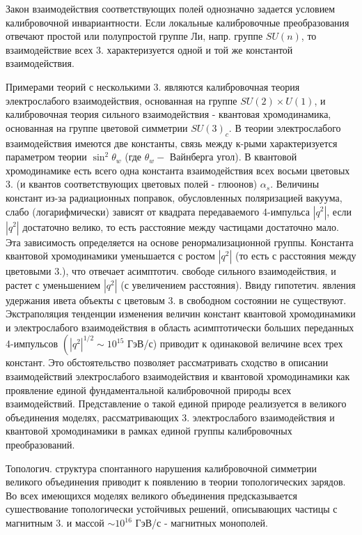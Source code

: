 \documentclass[10pt]{article}
\begin{document}
Закон взаимодействия соответствующих полей однозначно задается условием калибровочной инвариантности. Если локальные калибровочные преобразования отвечают простой или полупростой группе Ли, напр. группе $S U(n)$, то взаимодействие всех 3. характеризуется одной и той же константой взаимодействия.



Примерами теорий с несколькими 3. являются калибровочная теория электрослабого взаимодействия, основанная на группе $S U(2) \times U(1)$, и калибровочная теория сильного взаимодействия - квантовая хромодинамика, основанная на группе цветовой симметрии $S U(3)_{c}$. В теории электрослабого взаимодействия имеются две константы, связь между к-рыми характеризуется параметром теории $\sin ^{2} \theta_{w}$ (где $\theta_{w}-$ Вайнберга угол). В квантовой хромодинамике есть всего одна константа взаимодействия всех восьми цветовых 3. (и квантов соответствующих цветовых полей - глюонов) $\alpha_{s}$. Величины констант из-за радиационных поправок, обусловленных поляризацией вакуума, слабо (логарифмически) зависят от квадрата передаваемого 4-импульса $\left|q^{2}\right|$, если $\left|q^{2}\right|$ достаточно велико, то есть расстояние между частицами достаточно мало. Эта зависимость определяется на основе ренормализационной группы. Константа квантовой хромодинамики уменьшается с ростом $\left|q^{2}\right|$ (то есть с расстояния между цветовыми 3.), что отвечает асимптотич. свободе сильного взаимодействия, и растет с уменьшением $\left|q^{2}\right|$ (с увеличением расстояния). Ввиду гипотетич. явления удержания ивета объекты с цветовым 3. в свободном состоянии не существуют. Экстраполяция тенденции изменения величин констант квантовой хромодинамики и электрослабого взаимодействия в область асимптотически больших переданных 4-импульсов $\left(\left|q^{2}\right|^{1 / 2} \sim 10^{15}\right.$ ГэВ/с) приводит к одинаковой величине всех трех констант. Это обстоятельство позволяет рассматривать сходство в описании взаимодействий электрослабого взаимодействия и квантовой хромодинамики как проявление единой фундаментальной калибровочной природы всех взаимодействий. Представление о такой единой природе реализуется в великого объединения моделях, рассматривающих 3. электрослабого взаимодействия и квантовой хромодинамики в рамках единой группы калибровочных преобразований.



Топологич. структура спонтанного нарушения калибровочной симметрии великого объединения приводит к появлению в теории топологических зарядов. Во всех имеющихся моделях великого объединения предсказывается сушествование топологически устойчивых решений, описывающих частицы с магнитным 3. и массой $\sim 10^{16}$ ГэВ/с - магнитных монополей.
\end{document}
